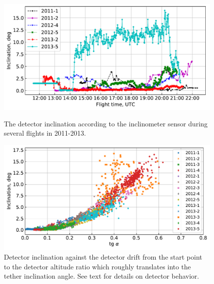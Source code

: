 \documentclass[universe,article,submit,moreauthors,pdftex]{Definitions/mdpi}
\begin{document}
\begin{figure}[tb]
    \begin{minipage}[t]{0.48\textwidth}
       \centering
       \includegraphics[width=\textwidth]{Telemetry_inclination.pdf}
       \caption{The detector inclination according to the inclinometer sensor during several flights in 2011-2013.}
       \label{fig:inclination} 
    \end{minipage}
    \hfill
    \begin{minipage}[t]{0.48\textwidth}
       \centering
       \includegraphics[width=\textwidth]{tg-inclination.pdf}
       \caption{Detector inclination against the detector drift from the start point to the detector altitude ratio which roughly translates into the tether inclination angle. See text for details on detector behavior.}
       \label{fig:drift-inclination}
   \end{minipage}
\end{figure}
\end{document}
